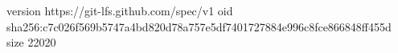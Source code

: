 version https://git-lfs.github.com/spec/v1
oid sha256:c7c026f569b5747a4bd820d78a757e5df7401727884e996c8fce866848ff455d
size 22020
